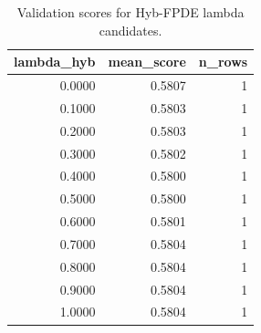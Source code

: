 \begin{table}[t]
\caption{Validation scores for Hyb-FPDE lambda candidates.}
\label{tab:lambda_distribution_computed}
\centering
\begin{tabular}{rrr}
\toprule
lambda\_hyb & mean\_score & n\_rows \\
\midrule
0.0000 & 0.5807 & 1 \\
0.1000 & 0.5803 & 1 \\
0.2000 & 0.5803 & 1 \\
0.3000 & 0.5802 & 1 \\
0.4000 & 0.5800 & 1 \\
0.5000 & 0.5800 & 1 \\
0.6000 & 0.5801 & 1 \\
0.7000 & 0.5804 & 1 \\
0.8000 & 0.5804 & 1 \\
0.9000 & 0.5804 & 1 \\
1.0000 & 0.5804 & 1 \\
\bottomrule
\end{tabular}

\end{table}
